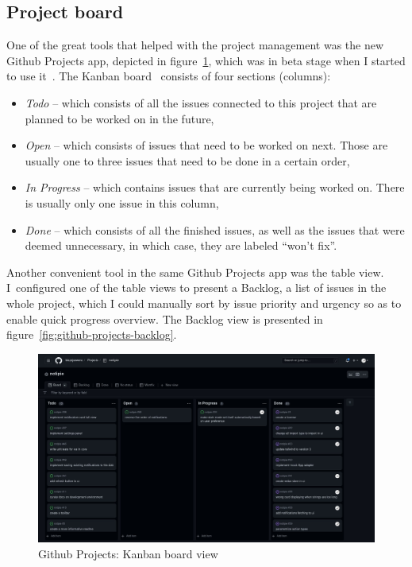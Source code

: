 \subsection{Project board}\label{sec:project-board}

One of the great tools that helped with the project management
was the new Github Projects app,
depicted in figure~\ref{fig:github-projects-kanban},
which was in beta stage
when I started to use it~\cite{github_inc_github_2022}.
The Kanban board~\cite{goddard_kanban_2022} consists of four sections (columns):

\begin{itemize}
      \item
            \textit{Todo} -- which consists of all the issues
            connected to this project
            that are planned to be worked on in the future,
      \item
            \textit{Open} -- which consists of issues
            that need to be worked on next.
            Those are usually one to three issues
            that need to be done in a certain order,
      \item
            \textit{In Progress} -- which contains issues
            that are currently being worked on.
            There is usually only one issue in this column,
      \item
            \textit{Done} -- which consists of all the finished issues,
            as well as the issues that were deemed unnecessary,
            in which case, they are labeled ``won't fix''.
\end{itemize}

Another convenient tool in the same Github Projects app
was the table view.
I~configured one of the table views to present a Backlog,
a list of issues in the whole project,
which I could manually sort by
issue priority and urgency
so as to enable quick progress overview.
The Backlog view is presented in figure~\ref{fig:github-projects-backlog}.

\begin{figure}[!h]
      \centering
      \includegraphics[width=0.99\linewidth,keepaspectratio]{img/kanban_board.jpg}
      \caption{Github Projects: Kanban board view}
      \label{fig:github-projects-kanban}
\end{figure}

